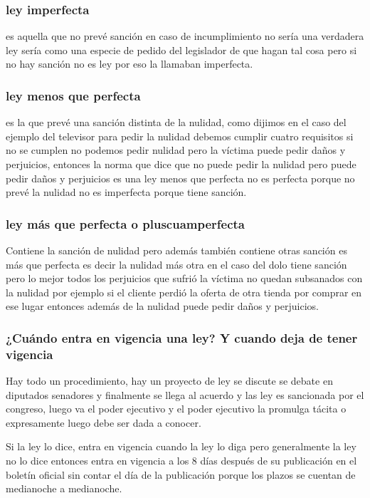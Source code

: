 \documentclass[12pt]{book}
\begin{document}
\subsubsection{ley imperfecta} es aquella que no prevé sanción en caso de incumplimiento no sería una verdadera ley sería como una especie de pedido del legislador de que hagan tal cosa pero si no hay sanción no es ley por eso la llamaban imperfecta.

\subsubsection{ley menos que perfecta} es la que prevé una sanción distinta de la nulidad, como dijimos en el caso del ejemplo del televisor para pedir la nulidad debemos cumplir cuatro requisitos si no se cumplen no podemos pedir nulidad pero la víctima puede pedir daños y perjuicios, entonces la norma que dice que no puede pedir la nulidad pero puede pedir daños y perjuicios es una ley menos que perfecta no es perfecta porque no prevé la nulidad no es imperfecta porque tiene sanción.

\subsubsection{ley más que perfecta o pluscuamperfecta}
Contiene la sanción de nulidad pero además también contiene otras sanción es más que perfecta es decir la nulidad más otra en el caso del dolo tiene sanción pero lo mejor todos los perjuicios que sufrió la víctima no quedan subsanados con la nulidad por ejemplo si el cliente perdió la oferta de otra tienda por comprar en ese lugar entonces además de la nulidad puede pedir daños y perjuicios.

\subsubsection{¿Cuándo entra en vigencia una ley? Y cuando deja de tener vigencia}

Hay todo un procedimiento, hay un proyecto de ley se discute se debate en diputados senadores y finalmente se llega al acuerdo y las ley es sancionada por el congreso, luego va el poder ejecutivo y el poder ejecutivo la promulga tácita o expresamente luego debe ser dada a conocer. 

Si la ley lo dice, entra en vigencia cuando la ley lo diga pero generalmente la ley no lo dice entonces entra en vigencia a los 8 días después de su publicación en el boletín oficial sin contar el día de la publicación porque los plazos se cuentan de medianoche a medianoche.
\end{document}
